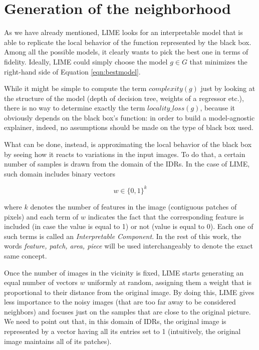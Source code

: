 \documentclass[12pt, twoside, a4paper]{report}
\begin{document}
\section{Generation of the neighborhood}

As we have already mentioned, LIME looks for an interpretable model that is able to replicate the local behavior of the function represented by the black box. Among all the possible models, it clearly wants to pick the best one in terms of fidelity. Ideally, LIME could simply choose the model $g \in G$ that minimizes the right-hand side of Equation \ref{eqn:bestmodel}. 

While it might be simple to compute the term $complexity(g)$ just by looking at the structure of the model (depth of decision tree, weights of a regressor etc.), there is no way to determine exactly the term $locality\_loss(g)$, because it obviously depends on the black box's function: in order to build a model-agnostic explainer, indeed, no assumptions should be made on the type of black box used. 

What can be done, instead, is approximating the local behavior of the black box by seeing how it reacts to variations in the input images. To do that, a certain number of samples is drawn from the domain of the IDRs. In the case of LIME, such domain includes binary vectors

\[
	w \in \{0,1\}^k
\]

where $k$ denotes the number of features in the image (contiguous patches of pixels) and each term of $w$ indicates the fact that the corresponding feature is included (in case the value is equal to 1) or not (value is equal to 0). Each one of such terms is called an \textit{Interpretable Component}. 
In the rest of this work, the words \textit{feature, patch, area, piece} will be used interchangeably to denote the exact same concept.

Once the number of images in the vicinity is fixed, LIME starts generating an equal number of vectors $w$ uniformly at random, assigning them a weight that is proportional to their distance from the original image. By doing this, LIME gives less importance to the noisy images (that are too far away to be considered neighbors) and focuses just on the samples that are close to the original picture.
We need to point out that, in this domain of IDRs, the original image is represented by a vector having all its entries set to 1 (intuitively, the original image maintains all of its patches).
\end{document}
